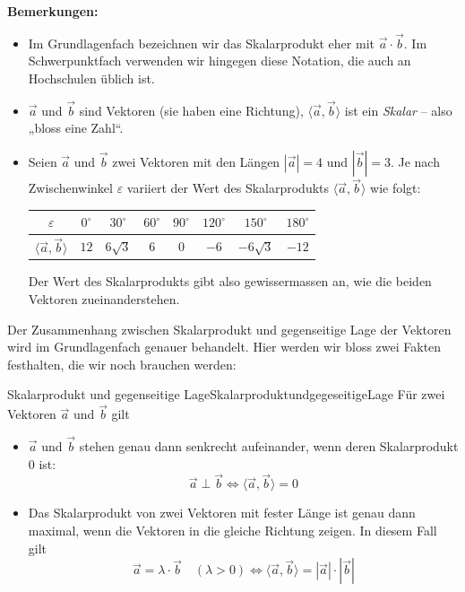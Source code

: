\textbf{Bemerkungen:}

\begin{itemize}
	\item Im Grundlagenfach bezeichnen wir das Skalarprodukt eher mit $\vec{a}\cdot \vec{b}$. Im Schwerpunktfach verwenden wir hingegen diese Notation, die auch an Hochschulen üblich ist.
	\item \( \vec{a} \) und \( \vec{b} \) sind Vektoren (sie haben eine Richtung),
	      \( \langle \vec{a}, \vec{b} \rangle \) ist ein \emph{Skalar} – also „bloss eine Zahl“.


	\item Seien \( \vec{a} \) und \( \vec{b} \) zwei Vektoren mit den Längen \( |\vec{a}| = 4 \) und \( |\vec{b}| = 3 \).
	      Je nach Zwischenwinkel \( \varepsilon \) variiert der Wert des Skalarprodukts \( \langle \vec{a}, \vec{b} \rangle \) wie folgt:

	      \begin{center}
		      \begin{tabular}{c|ccccccc}
			      \( \varepsilon \)                      & \( 0^\circ \) & \( 30^\circ \)  & \( 60^\circ \) & \( 90^\circ \) & \( 120^\circ \) & \( 150^\circ \)  & \( 180^\circ \) \\
			      \hline
			      \( \langle \vec{a}, \vec{b} \rangle \) & $12$          & \( 6\sqrt{3} \) & $6$            & $0$            & $-6$            & \( -6\sqrt{3} \) & $-12$
		      \end{tabular}
	      \end{center}



	      Der Wert des Skalarprodukts gibt also gewissermassen an, wie die beiden Vektoren zueinanderstehen.

\end{itemize}

Der Zusammenhang zwischen Skalarprodukt und gegenseitige Lage der Vektoren wird im Grundlagenfach genauer behandelt. Hier werden wir bloss zwei Fakten festhalten, die wir noch brauchen werden:
\clearpage
\begin{satz}
	{Skalarprodukt und gegenseitige Lage}{SkalarproduktundgegeseitigeLage}
	Für zwei Vektoren $\vec{a}$ und $\vec{b}$ gilt

	\begin{itemize}
		\item $ \vec{a}$ und $\vec{b}$ stehen genau dann senkrecht aufeinander, wenn deren Skalarprodukt $0$ ist:
		      $$ \vec{a} \perp \vec{b} \iff \langle\vec{a}, \vec{b} \rangle = 0$$
		\item Das Skalarprodukt von zwei Vektoren mit fester Länge ist genau dann maximal, wenn die Vektoren in die gleiche Richtung zeigen. In diesem Fall gilt
		      $$\vec{a} = \lambda\cdot \vec{b} \quad (\lambda >0)  \iff \langle\vec{a}, \vec{b} \rangle  = |\vec{a}| \cdot |\vec{b}|$$
	\end{itemize}

\end{satz}

